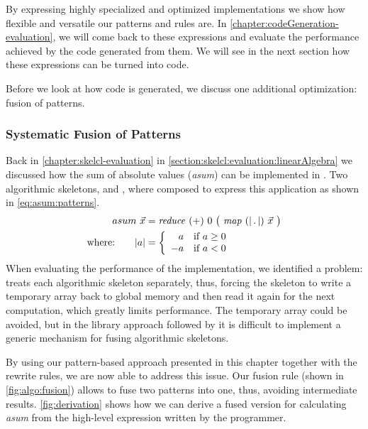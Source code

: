 By expressing highly specialized and optimized implementations we show how flexible and versatile our patterns and rules are.
In \autoref{chapter:codeGeneration-evaluation}, we will come back to these expressions and evaluate the performance achieved by the \OpenCL code generated from them.
We will see in the next section how these expressions can be turned into \OpenCL code.

\bigskip


Before we look at how \OpenCL code is generated, we discuss one additional optimization: fusion of patterns.















\subsubsection{Systematic Fusion of Patterns}
Back in \autoref{chapter:skelcl-evaluation} in \autoref{section:skelcl:evaluation:linearAlgebra} we discussed how the sum of absolute values (\emph{asum}) can be implemented in \SkelCL.
Two algorithmic skeletons, \reduce and \map, where composed to express this application as shown in \autoref{eq:asum:patterns}.
\begin{align}
  asum\ \vec{x} &= \reduce\ (+)\ 0\ \big(\ \map\ (|\, .\, |)\ \vec{x}\ \big)\label{eq:asum:patterns}\\
  \text{where:} \qquad | a | &=
    \left\{
      \begin{array}{r l}
      a & \text{if } a \geq 0\\
      -a & \text{if } a < 0
      \end{array}
    \right.\nonumber
\end{align}
%
When evaluating the performance of the \SkelCL implementation, we identified a problem:
\SkelCL treats each algorithmic skeleton separately, thus, forcing the \map skeleton to write a temporary array back to global memory and then read it again for the next computation, which greatly limits performance.
The temporary array could be avoided, but in the library approach followed by \SkelCL it is difficult to implement a generic mechanism for fusing algorithmic skeletons.


By using our pattern-based approach presented in this chapter together with the rewrite rules, we are now able to address this issue.
Our fusion rule (shown in \autoref{fig:algo:fusion}) allows to fuse two patterns into one, thus, avoiding intermediate results.
\autoref{fig:derivation} shows how we can derive a fused version for calculating \emph{asum} from the high-level expression written by the programmer.

